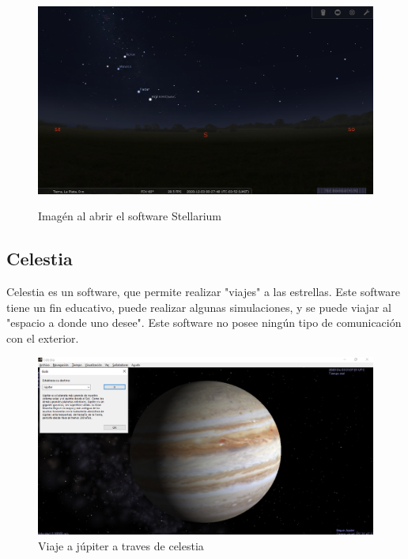 \begin{figure}[ht]
	\centering
	\includegraphics[width=\linewidth,height= 7cm]{stellarium}
	\caption{Imagén al abrir el software Stellarium }
	\label{fig:stelarium_init}
\end{figure}




\subsection{Celestia} 
Celestia es un software, que permite realizar "viajes" a las estrellas. Este software tiene un fin educativo, puede realizar algunas simulaciones, y se puede viajar al "espacio a donde uno desee". Este software no posee ningún tipo de comunicación con el exterior. 
\begin{figure}[ht]
	\centering
	\includegraphics[scale=0.3]{celestia}
	\caption{Viaje a júpiter a traves de celestia}
\end{figure}



